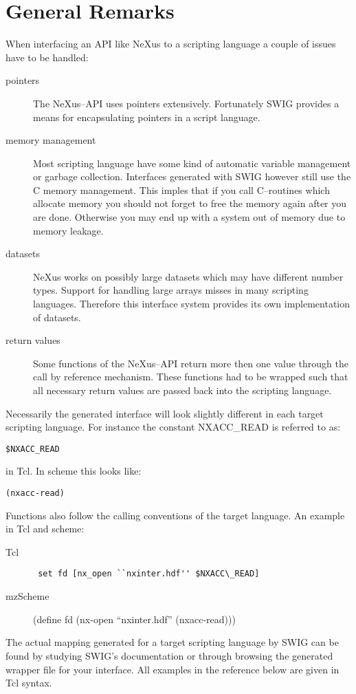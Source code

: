 \documentclass[12pt,a4paper]{article}
\begin{document}
\section{General Remarks}
When interfacing an API like NeXus to a scripting language
a couple of issues have to be handled:
\begin{description}
\item[pointers] The NeXus--API uses pointers extensively. Fortunately
SWIG provides a means for encapsulating pointers in a script language.
\item[memory management] Most scripting language have some kind of
automatic variable management or garbage collection. Interfaces
generated with SWIG however still use the C memory management. This
imples that if you call C--routines which allocate memory you should
not forget to free the memory again after you are done. Otherwise you
may end up with a system out of memory due to memory leakage. 
\item[datasets] NeXus works on possibly large datasets which may have
different number types. Support for handling large arrays misses in
many scripting languages. Therefore this interface system provides its
own implementation of datasets. 
\item[return values] Some functions of the NeXus--API return more then
one value through the call by reference mechanism. These functions had
to be wrapped such that all necessary return values are passed back
into the scripting language. 
\end{description} 

Necessarily the generated interface will look slightly different in
each target scripting language. For instance the constant NXACC\_READ
is referred to as:
\begin{verbatim}
$NXACC_READ
\end{verbatim} in Tcl. In scheme this looks like: 
\begin{verbatim}
(nxacc-read)
\end{verbatim}  
Functions also follow the calling conventions of the target
language. An example in Tcl and scheme:
\begin{description}
\item[Tcl] \verb+ set fd [nx_open ``nxinter.hdf'' $NXACC\_READ] +
\item[mzScheme] (define fd (nx-open ``nxinter.hdf'' (nxacc-read)))
\end{description}
The actual mapping generated for a target scripting language by SWIG
can be found by studying SWIG's documentation or through browsing the
generated wrapper file for your interface. All examples in the
reference below are given in Tcl syntax. 
\end{document}
